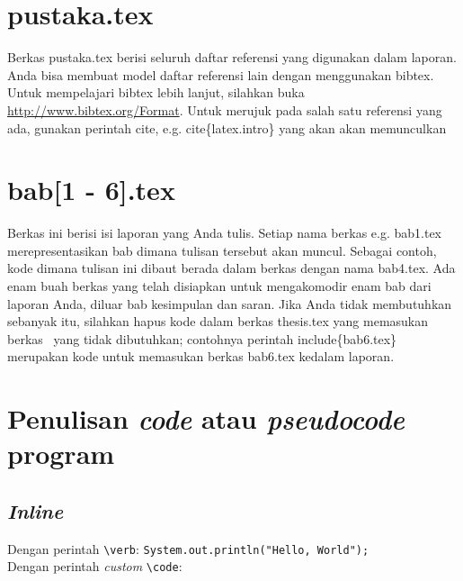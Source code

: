 \section{pustaka.tex}
Berkas pustaka.tex berisi seluruh daftar referensi yang digunakan dalam 
laporan. 
Anda bisa membuat model daftar referensi lain dengan menggunakan bibtex.
Untuk mempelajari bibtex lebih lanjut, silahkan buka 
\url{http://www.bibtex.org/Format}. 
Untuk merujuk pada salah satu referensi yang ada, gunakan perintah \bslash 
cite, e.g. \bslash cite\{latex.intro\} yang akan akan memunculkan 
\cite{latex.intro}


\section{bab[1 - 6].tex}
Berkas ini berisi isi laporan yang Anda tulis. 
Setiap nama berkas e.g. bab1.tex merepresentasikan bab dimana tulisan tersebut 
akan muncul. 
Sebagai contoh, kode dimana tulisan ini dibaut berada dalam berkas dengan nama 
bab4.tex. 
Ada enam buah berkas yang telah disiapkan untuk mengakomodir enam bab dari 
laporan Anda, diluar bab kesimpulan dan saran. 
Jika Anda tidak membutuhkan sebanyak itu, silahkan hapus kode dalam berkas 
thesis.tex yang memasukan berkas \latex~yang tidak dibutuhkan;  contohnya 
perintah \bslash include\{bab6.tex\} merupakan kode untuk memasukan berkas 
bab6.tex kedalam laporan.

\section{Penulisan \textit{code} atau \textit{pseudocode} program}

\subsection{\textit{Inline}}

Dengan perintah \verb|\verb|: \verb|System.out.println("Hello, World");| \\
Dengan perintah \textit{custom} \verb|\code|: 


